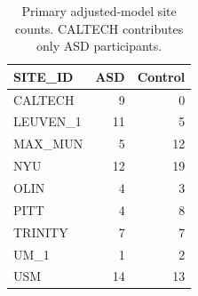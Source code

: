 \begin{table}[htbp]
\centering
\small
\caption{Primary adjusted-model site counts. CALTECH contributes only ASD participants.}\label{tab:Ssites}
\begin{tabular}{lrr}
\toprule
SITE\_ID & ASD & Control \\
\midrule
CALTECH & 9 & 0 \\
LEUVEN\_1 & 11 & 5 \\
MAX\_MUN & 5 & 12 \\
NYU & 12 & 19 \\
OLIN & 4 & 3 \\
PITT & 4 & 8 \\
TRINITY & 7 & 7 \\
UM\_1 & 1 & 2 \\
USM & 14 & 13 \\
\bottomrule
\end{tabular}
\end{table}
